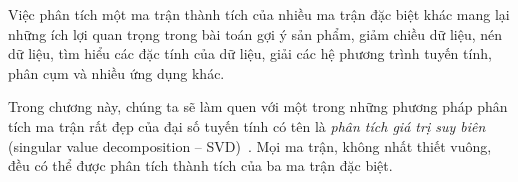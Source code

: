 Việc phân tích một ma trận thành tích của nhiều ma trận đặc biệt khác mang lại
những ích lợi quan trọng trong bài toán gợi ý sản phẩm, giảm chiều dữ liệu, nén dữ liệu,
tìm hiểu các đặc tính của dữ liệu, giải các hệ phương trình tuyến tính,
phân cụm và nhiều ứng dụng khác. 
 
Trong chương này, chúng ta sẽ làm quen với một trong những phương pháp phân tích
ma trận rất đẹp của đại số tuyến tính có tên là \textit{phân tích giá trị suy
biên} (singular value decomposition -- SVD)~\cite{golub1970singular}. Mọi ma
trận, không nhất thiết vuông, đều có thể được phân tích thành tích của ba ma
trận đặc biệt.
 
 
 
 
 
 
 
 

     
     
     
